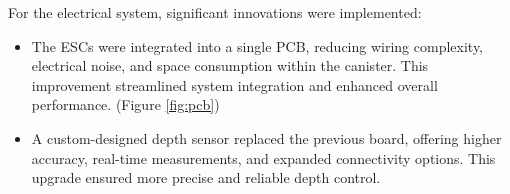 For the electrical system, significant innovations were implemented:

\vspace{-0.5\baselineskip}
\begin{itemize}
    \setlength{\itemsep}{0pt}
    \item The ESCs were integrated into a single PCB, reducing wiring complexity, electrical noise, and space consumption within the canister. This improvement streamlined system integration and enhanced overall performance. (Figure \ref{fig:pcb})
    \item A custom-designed depth sensor replaced the previous board, offering higher accuracy, real-time measurements, and expanded connectivity options. This upgrade ensured more precise and reliable depth control.
\end{itemize}

